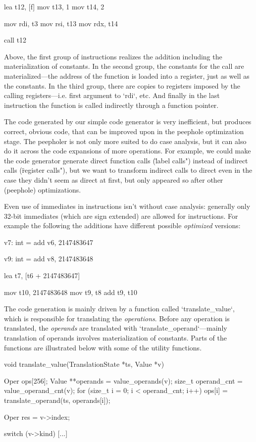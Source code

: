 lea t12, [f]
mov t13, 1
mov t14, 2

mov rdi, t3
mov rsi, t13
mov rdx, t14

call t12
\endtt

Above, the first group of instructions realizes the addition including the
materialization of constants. In the second group, the constants for the call
are materialized---the address of the function is loaded into a register, just
as well as the constants. In the third group, there are copies to registers imposed by the
calling registers---i.e. first argument to `rdi`, etc. And finally in the last
instruction the function is called indirectly through a function pointer.

The code generated by our simple code generator is very inefficient, but
produces correct, obvious code, that can be improved upon in the peephole
optimization stage. The peepholer is not only more suited to do case analysis,
but it can also do it across the code expansions of more operations. For
example, we could make the code generator generate direct function calls
(\"label calls") instead of indirect calls (\"register calls"), but we want to
transform indirect calls to direct even in the case they didn't seem as direct
at first, but only appeared so after other (peephole) optimizations.

Even use of immediates in instructions isn't without case analysis: generally
only 32-bit immediates (which are sign extended) are allowed for instructions.
For example the following the additions have different possible {\em optimized}
versions:

\begtt
v7: int = add v6, 2147483647

v9: int = add v8, 2147483648
\endtt

\begtt
lea t7, [t6 + 2147483647]

mov t10, 2147483648
mov t9, t8
add t9, t10
\endtt

The code generation is mainly driven by a function called `translate_value`,
which is responsible for translating the {\em operations}. Before any operation
is translated, the {\em operands} are translated with
`translate_operand`---mainly translation of operands involves materialization of
constants. Parts of the functions are illustrated below with some of the utility
functions.

\begtt
void translate_value(TranslationState *ts, Value *v) {
	Oper ops[256];
	Value **operands = value_operands(v);
	size_t operand_cnt = value_operand_cnt(v);
	for (size_t i = 0; i < operand_cnt; i++)
		ops[i] = translate_operand(ts, operands[i]);

	Oper res = v->index;

	switch (v->kind) {
		[...]
	}
}
\endtt

